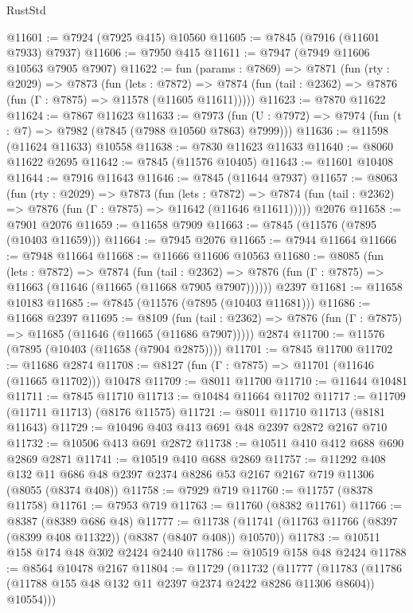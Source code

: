 \begin{lexlean}{RustStd}
\begin{coremodule}
@11601 := @7924 (@7925 @415) @10560
@11605 := @7845 (@7916 (@11601 @7933) @7937)
@11606 := @7950 @415
@11611 := @7947 (@7949 @11606 @10563 @7905 @7907)
@11622 := fun (params : @7869) =>
  @7871
    (fun (rty : @2029) =>
    @7873
      (fun (lets : @7872) =>
      @7874 (fun (tail : @2362) => @7876 (fun (Γ : @7875) => @11578 (@11605 @11611)))))
@11623 := @7870 @11622
@11624 := @7867 @11623
@11633 := @7973
    (fun (U : @7972) => @7974 (fun (t : @7) => @7982 (@7845 (@7988 @10560 @7863) @7999)))
@11636 := @11598 (@11624 @11633) @10558
@11638 := @7830 @11623 @11633
@11640 := @8060 @11622 @2695
@11642 := @7845 (@11576 @10405)
@11643 := @11601 @10408
@11644 := @7916 @11643
@11646 := @7845 (@11644 @7937)
@11657 := @8063
    (fun (rty : @2029) =>
    @7873
      (fun (lets : @7872) =>
      @7874 (fun (tail : @2362) => @7876 (fun (Γ : @7875) => @11642 (@11646 @11611)))))
    @2076
@11658 := @7901 @2076
@11659 := @11658 @7909
@11663 := @7845 (@11576 (@7895 (@10403 @11659)))
@11664 := @7945 @2076
@11665 := @7944 @11664
@11666 := @7948 @11664
@11668 := @11666 @11606 @10563
@11680 := @8085
    (fun (lets : @7872) =>
    @7874
      (fun (tail : @2362) =>
      @7876 (fun (Γ : @7875) => @11663 (@11646 (@11665 (@11668 @7905 @7907))))))
    @2397
@11681 := @11658 @10183
@11685 := @7845 (@11576 (@7895 (@10403 @11681)))
@11686 := @11668 @2397
@11695 := @8109
    (fun (tail : @2362) => @7876 (fun (Γ : @7875) => @11685 (@11646 (@11665 (@11686 @7907)))))
    @2874
@11700 := @11576 (@7895 (@10403 (@11658 (@7904 @2875))))
@11701 := @7845 @11700
@11702 := @11686 @2874
@11708 := @8127 (fun (Γ : @7875) => @11701 (@11646 (@11665 @11702))) @10478
@11709 := @8011 @11700
@11710 := @11644 @10481
@11711 := @7845 @11710
@11713 := @10484 @11664 @11702
@11717 := @11709 (@11711 @11713) (@8176 @11575)
@11721 := @8011 @11710 @11713 (@8181 @11643)
@11729 := @10496 @403 @413 @691 @48 @2397 @2872 @2167 @710
@11732 := @10506 @413 @691 @2872
@11738 := @10511 @410 @412 @688 @690 @2869 @2871
@11741 := @10519 @410 @688 @2869
@11757 := @11292
    @408
    @132
    @11
    @686
    @48
    @2397
    @2374
    @8286
    @53
    @2167
    @2167
    @719
    @11306
    (@8055 (@8374 @408))
@11758 := @7929 @719
@11760 := @11757 (@8378 @11758)
@11761 := @7953 @719
@11763 := @11760 (@8382 @11761)
@11766 := @8387 (@8389 @686 @48)
@11777 := @11738 (@11741 (@11763 @11766 (@8397 (@8399 @408 @11322)) (@8387 (@8407 @408)) @10570))
@11783 := @10511 @158 @174 @48 @302 @2424 @2440
@11786 := @10519 @158 @48 @2424
@11788 := @8564 @10478 @2167
@11804 := @11729
    (@11732
      (@11777
        (@11783 (@11786 (@11788 @155 @48 @132 @11 @2397 @2374 @2422 @8286 @11306 @8604)) @10554)))

\end{coremodule}
\end{lexlean}
